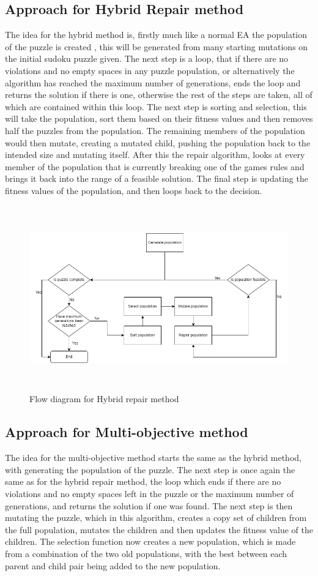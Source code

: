 \documentclass[a4paper,11pt]{article}
\begin{document}
\subsection{Approach for Hybrid Repair method}

The idea for the hybrid method is, firstly much like a normal EA the population of the puzzle is created , this will be generated from many starting mutations on the initial sudoku puzzle given. The next step is a loop, that if there are no violations and no empty spaces in any puzzle population, or alternatively the algorithm has reached the maximum number of generations, ends the loop and returns the solution if there is one, otherwise the rest of the steps are taken, all of which are contained within this loop. The next step is sorting and selection, this will take the population, sort them based on their fitness values and then removes half the puzzles from the population. The remaining members of the population would then mutate, creating a mutated child, pushing the population back to the intended size and mutating itself. After this the repair algorithm, looks at every member of the population that is currently breaking one of the games rules and brings it back into the range of a feasible solution. The final step is updating the fitness values of the population, and then loops back to the decision.
\begin{figure}[H]
	\centering
	\includegraphics[height=8cm, width=15cm]{./Diagrams/hybridRepairFlowchart}
	\caption{Flow diagram for Hybrid repair method}
\end{figure}
\subsection{Approach for Multi-objective method}
The idea for the multi-objective method starts the same as the hybrid method, with generating the population of the puzzle. The next step is once again the same as for the hybrid repair method, the loop which ends if there are no violations and no empty spaces left in the puzzle or the maximum number of generations, and returns the solution if one was found. The next step is then mutating the puzzle, which in this algorithm, creates a copy set of children from the full population, mutates the children and then updates the fitness value of the children. The selection function now creates a new population, which is made from a combination of the two old populations, with the best between each parent and child pair being added to the new population.  
\end{document}
